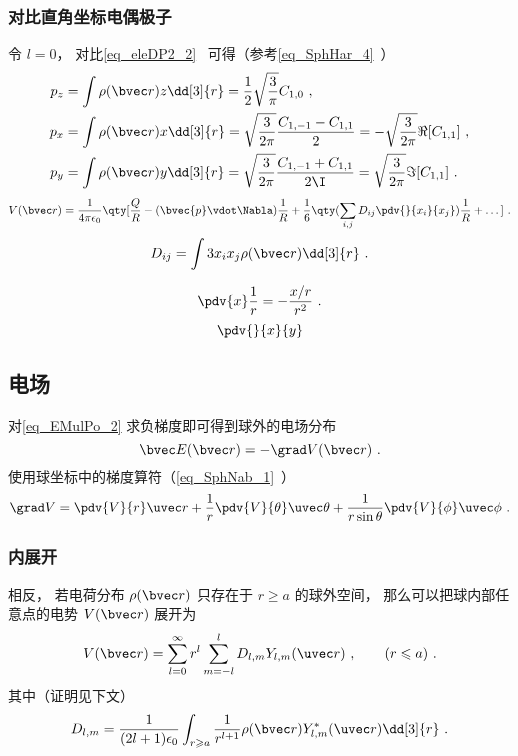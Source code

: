 \subsubsection{对比直角坐标电偶极子}
令 $l=0$， 对比\autoref{eq_eleDP2_2}~ 可得（参考\autoref{eq_SphHar_4}~）
\begin{align} %
p_z &= \int\rho(\bvec r)z\dd[3]{r} = \frac12\sqrt{\frac{3}{\pi}} C_{1,0}~,\\
p_x &= \int\rho(\bvec r)x\dd[3]{r} = \sqrt{\frac{3}{2\pi}} \frac{C_{1,-1}-C_{1,1}}{2} = -\sqrt{\frac{3}{2\pi}} \Re[C_{1,1}]~,\\
p_y &= \int\rho(\bvec r)y\dd[3]{r} = \sqrt{\frac{3}{2\pi}} \frac{C_{1,-1}+C_{1,1}}{2\I} = \sqrt{\frac{3}{2\pi}} \Im[C_{1,1}]~.
\end{align}
\begin{equation}
V(\bvec r) = \frac{1}{4\pi\epsilon_0} \qty[\frac{Q}{R} - (\bvec{p} \vdot \Nabla)\frac{1}{R} + \frac{1}{6}\qty(\sum_{i,j} D_{ij}\pdv{}{x_i}{x_j})\frac{1}{R} + \dots]~.
\end{equation}
\begin{equation}
D_{ij}= \int 3 x_i x_j \rho(\bvec r) \dd[3]{r}~.
\end{equation}

\begin{equation}
\pdv{x}\frac{1}{r} = -\frac{x/r}{r^2}~.
\end{equation}
\begin{equation}
\pdv{}{x}{y}
\end{equation}



\subsection{电场}
对\autoref{eq_EMulPo_2} 求负梯度即可得到球外的电场分布
\begin{equation}
\bvec E(\bvec r) = -\grad V(\bvec r)~.
\end{equation}
使用球坐标中的梯度算符（\autoref{eq_SphNab_1}~）
\begin{equation}
\grad V = \pdv{V}{r}\uvec r + \frac{1}{r} \pdv{V}{\theta}\uvec \theta  + \frac{1}{r\sin \theta }\pdv{V}{\phi}\uvec \phi~.
\end{equation}

\subsubsection{内展开}
相反， 若电荷分布 $\rho(\bvec r)$ 只存在于 $r \geqslant a$ 的球外空间， 那么可以把球内部任意点的电势 $V(\bvec r)$ 展开为
\begin{equation}\label{eq_EMulPo_4}
V(\bvec r) = \sum_{l = 0}^\infty r^l \sum_{m = -l}^l D_{l,m} Y_{l,m}(\uvec r)~, \qquad (r \leqslant a)~.
\end{equation}
其中（证明见下文）
\begin{equation}\label{eq_EMulPo_3}
D_{l,m} = \frac{1}{(2l+1)\epsilon_0} \int_{r\geqslant a} \frac{1}{r^{l+1}} \rho(\bvec r) Y_{l,m}^*(\uvec r) \dd[3]{r}~.
\end{equation}

